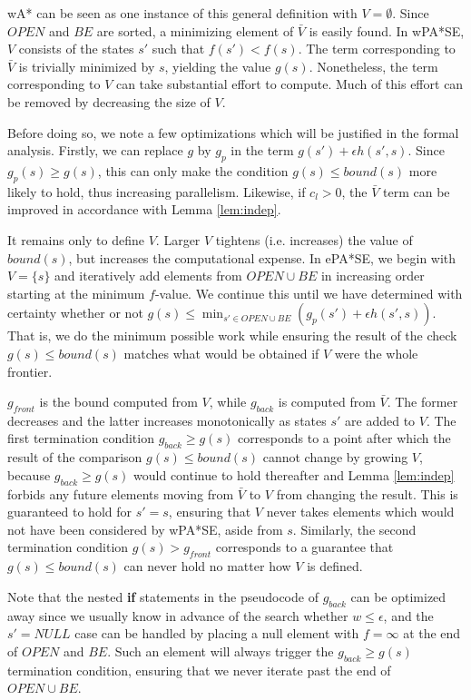 \documentclass[letterpaper]{article}
\begin{document}
wA* can be seen as one instance of this general definition with $V = \emptyset$. Since $OPEN$ and $BE$ are sorted, a minimizing element of $\bar V$ is easily found. In wPA*SE, $V$ consists of the states $s'$ such that $f(s') < f(s)$. The term corresponding to $\bar V$ is trivially minimized by $s$, yielding the value $g(s)$. Nonetheless, the term corresponding to $V$ can take substantial effort to compute. Much of this effort can be removed by decreasing the size of $V$.

Before doing so, we note a few optimizations which will be justified in the formal analysis. Firstly, we can replace $g$ by $g_p$ in the term $g(s') + \epsilon h(s',s)$. Since $g_p(s) \ge g(s)$, this can only make the condition $g(s) \le bound(s)$ more likely to hold, thus increasing parallelism. Likewise, if $c_l > 0$, the $\bar V$ term can be improved in accordance with Lemma \ref{lem:indep}.

It remains only to define $V$. Larger $V$ tightens (i.e. increases) the value of $bound(s)$, but increases the computational expense. In ePA*SE, we begin with $V = \{s\}$ and iteratively add elements from $OPEN\cup BE$ in increasing order starting at the minimum $f$-value. We continue this until we have determined with certainty whether or not $g(s) \le \min_{s'\in OPEN\cup BE}\left(g_p(s') + \epsilon h(s',s)\right)$. That is, we do the minimum possible work while ensuring the result of the check $g(s) \le bound(s)$ matches what would be obtained if $V$ were the whole frontier.

$g_{front}$ is the bound computed from $V$, while $g_{back}$ is computed from $\bar V$. The former decreases and the latter increases monotonically as states $s'$ are added to $V$. The first termination condition $g_{back} \ge g(s)$ corresponds to a point after which the result of the comparison $g(s) \le bound(s)$ cannot change by growing $V$, because $g_{back} \ge g(s)$ would continue to hold thereafter and Lemma \ref{lem:indep} forbids any future elements moving from $\bar V$ to $V$ from changing the result. This is guaranteed to hold for $s' = s$, ensuring that $V$ never takes elements which would not have been considered by wPA*SE, aside from $s$. Similarly, the second termination condition $g(s) > g_{front}$ corresponds to a guarantee that $g(s) \le bound(s)$ can never hold no matter how $V$ is defined.

Note that the nested \textbf{if} statements in the pseudocode of $g_{back}$ can be optimized away since we usually know in advance of the search whether $w \le \epsilon$, and the $s' = NULL$ case can be handled by placing a null element with $f = \infty$ at the end of $OPEN$ and $BE$. Such an element will always trigger the $g_{back} \ge g(s)$ termination condition, ensuring that we never iterate past the end of $OPEN\cup BE$.
\end{document}
